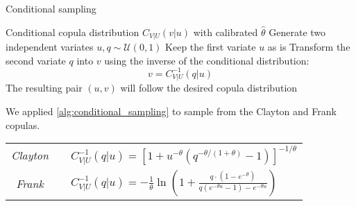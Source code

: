 
\begin{algorithm}[H]
\caption{Conditional sampling}
\label{alg:conditional_sampling}
\begin{algorithmic}[1]
\Require Conditional copula distribution $C_{V|U}(v|u)$ with calibrated $\hat \theta$
\State Generate two independent variates $u,q\sim \mathcal U(0,1)$
\State Keep the first variate $u$ as is
\State Transform the second variate $q$ into $v$ using the inverse of the conditional distribution:
$$v = C^{-1}_{V|U}(q|u)$$
\Ensure The resulting pair $(u,v)$ will follow the desired copula distribution
\end{algorithmic}
\end{algorithm}

We applied \cref{alg:conditional_sampling} to sample from the Clayton and Frank copulas.


\vspace{0.2cm}
{\centering
\renewcommand{\arraystretch}{1.8}  
\begin{tabular}{ccp{10cm}}
\textit{Clayton} && 
$\displaystyle 
C_{V|U}^{-1} (q|u)= \left[1+u^{-\theta}(q^{-\theta/(1+\theta)} - 1)\right]^{-1/\theta}
$ 
\\
\textit{Frank} && 
$\displaystyle 
C_{V|U}^{-1} (q|u)= -\frac{1}{\theta} \ln \left( 1 + \frac{q \cdot (1 - e^{-\theta})}{q  (e^{-\theta u} - 1) - e^{-\theta u}} \right)
$
\\
\end{tabular}
\par}




